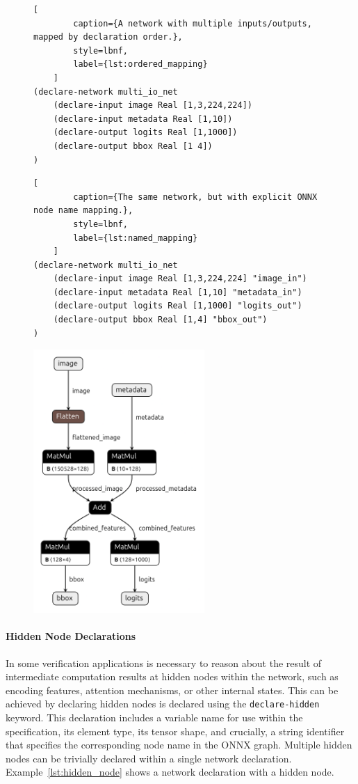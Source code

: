 \begin{figure}[h!]
    \centering
    \begin{lstlisting}[
        caption={A network with multiple inputs/outputs, mapped by declaration order.},
        style=lbnf,
        label={lst:ordered_mapping}
    ]
(declare-network multi_io_net
    (declare-input image Real [1,3,224,224])
    (declare-input metadata Real [1,10])
    (declare-output logits Real [1,1000])
    (declare-output bbox Real [1 4])
)
    \end{lstlisting}
    \begin{lstlisting}[
        caption={The same network, but with explicit ONNX node name mapping.},
        style=lbnf,
        label={lst:named_mapping}
    ]
(declare-network multi_io_net
    (declare-input image Real [1,3,224,224] "image_in")
    (declare-input metadata Real [1,10] "metadata_in")
    (declare-output logits Real [1,1000] "logits_out")
    (declare-output bbox Real [1,4] "bbox_out")
)
    \end{lstlisting}
    \vspace{0.5cm}
    \includegraphics[height=10cm]{imgs/multi_io_net.onnx.png}
\end{figure}


\paragraph{Hidden Node Declarations}
\label{sec:hidden-node-declarations}
In some verification applications is necessary to reason about the result of intermediate computation results at hidden nodes within the network, such as encoding features, attention mechanisms, or other internal states.
This can be achieved by declaring hidden nodes is declared using the \texttt{declare-hidden} keyword. This declaration includes a variable name for use within the \vnnlib{} specification, 
its element type, its tensor shape, and crucially, a string identifier that specifies the corresponding node name in the ONNX graph.  Multiple
hidden nodes can be trivially declared within a single network declaration. Example~\ref{lst:hidden_node} shows a \vnnlib{} network declaration with a hidden node.

